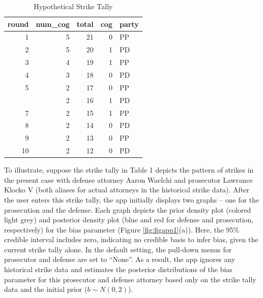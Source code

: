 \documentclass[12pt]{article}
\begin{document}
\begin{table}

\caption{\label{tab:inpts}Hypothetical Strike Tally}
\centering
\begin{tabular}[t]{rrrrl}
\toprule
round & num\_cog & total & cog & party\\
\midrule
1 & 5 & 21 & 0 & PP\\
2 & 5 & 20 & 1 & PD\\
3 & 4 & 19 & 1 & PP\\
4 & 3 & 18 & 0 & PD\\
5 & 2 & 17 & 0 & PP\\
\addlinespace
6 & 2 & 16 & 1 & PD\\
7 & 2 & 15 & 1 & PP\\
8 & 2 & 14 & 0 & PD\\
9 & 2 & 13 & 0 & PP\\
10 & 2 & 12 & 0 & PD\\
\bottomrule
\end{tabular}
\end{table}

To illustrate, suppose the strike tally in Table 1 depicts the pattern of strikes in the present case with defense attorney Aaron Waelchi and prosecutor Lawrance Klocko V (both aliases for actual attorneys in the historical strike data). After the user enters this strike tally, the app initially displays two graphs -- one for the prosecution and the defense. Each graph depicts the prior density plot (colored light grey) and posterior density plot (blue and red for defense and prosecution, respectively) for the bias parameter (Figure \ref{fig:figapp1}(a)). Here, the 95\% credible interval includes zero, indicating no credible basis to infer bias, given the current strike tally alone. In the default setting, the pull-down menus for prosecutor and defense are set to ``None''. As a result, the app ignores any historical strike data and estimates the posterior distributions of the bias parameter for this prosecutor and defense attorney based only on the strike tally data and the initial prior (\(b \sim N(0,2)\)).
\end{document}
